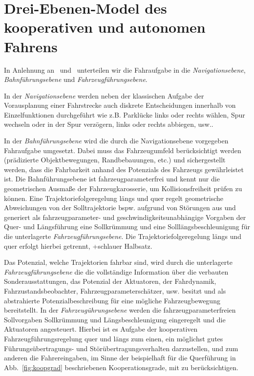 \section{Drei-Ebenen-Model des kooperativen und autonomen Fahrens}
\label{ch_3EM}
In Anlehnung an~\cite{Rasmussen1983} und~\cite{Donges1982} unterteilen wir die Fahraufgabe in die  \textit{Navigationsebene},  \textit{Bahnführungsebene} und  \textit{Fahrzeugführungsebene}.

In der \textit{Navigationsebene} werden neben der klassischen Aufgabe der Vorausplanung einer Fahrstrecke auch diskrete Entscheidungen innerhalb von Einzelfunktionen durchgeführt wie z.B. Parklücke links oder rechts wählen, Spur wechseln oder in der Spur verzögern, links oder rechts abbiegen, usw..

In der \textit{Bahnführungsebene} wird die durch die Navigationsebene vorgegeben Fahraufgabe umgesetzt.  Dabei muss das Fahrzeugumfeld berücksichtigt werden (prädizierte Objektbewegungen, Randbebauungen, etc.) und sichergestellt werden, dass die Fahrbarkeit anhand des Potenzials des Fahrzeugs gewährleistet ist. Die Bahnführungsebene ist fahrzeugparameterfrei und kennt nur die geometrischen Ausmaße der Fahrzeugkarosserie, um Kollisionsfreiheit prüfen zu können. Eine Trajektoriefolgeregelung längs und quer regelt geometrische Abweichungen von der Solltrajektorie bspw. aufgrund von Störungen aus und generiert als fahrzeugparameter- und geschwindigkeitsunabhängige Vorgaben der Quer- und Längsführung eine Sollkrümmung und eine Solllängsbeschleunigung für die unterlagerte \textit{Fahrzeugführungsebene}. Die Trajektoriefolgeregelung längs und quer erfolgt hierbei getrennt, +schlauer Halbsatz.

Das Potenzial, welche Trajektorien fahrbar sind, wird durch die unterlagerte \textit{Fahrzeugführungsebene} die die vollständige Information über die verbauten Sonderausstattungen, das Potenzial der Aktuatoren, der Fahrdynamik, Fahrzustandsbeobachter, Fahrzeugparameterschätzer, usw. besitzt und als abstrahierte Potenzialbeschreibung für eine mögliche Fahrzeugbewegung bereitstellt. In der \textit{Fahrzeugührungsebene} werden die fahrzeugparameterfreien Sollvorgaben Sollkrümmung und Längsbeschleunigung eingeregelt und die Aktuatoren angesteuert.
Hierbei ist es Aufgabe der kooperativen Fahrzeugführungsregelung quer und längs zum einen, ein möglichst gutes Führungsübertragungs- und Störübertragungsverhalten darzustellen,
und zum anderen die Fahrereingaben, im Sinne der beispielhaft für die Querführung in Abb.~\ref{fig:koopgrad} beschriebenen Kooperationsgrade, mit zu berücksichtigen. 

